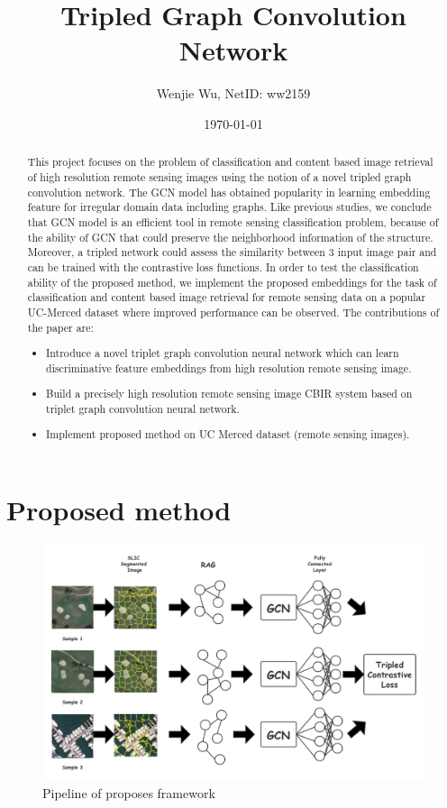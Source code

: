 \documentclass[11pt]{article}
\begin{document}
\title{Tripled Graph Convolution Network}
\date{\today}
\author{Wenjie Wu, NetID: ww2159}
\maketitle
\begin{abstract}
This project focuses on the problem of classification and content based image retrieval of high resolution remote sensing images using the notion of a novel tripled graph convolution network. The GCN model has obtained popularity in learning embedding feature for irregular domain data including graphs. Like previous studies, we conclude that GCN model is an efficient tool in remote sensing classification problem, because of the ability of GCN that could preserve the neighborhood information of the structure. Moreover, a tripled network could assess the similarity between 3 input image pair and can be trained with the contrastive loss functions. In order to test the classification ability of the proposed method, we implement the proposed embeddings for the task of classification and content based image retrieval for remote sensing data on a popular UC-Merced dataset where improved performance can be observed. The contributions of the paper are:
\begin{itemize}
	\item Introduce a novel triplet graph convolution neural network which can learn discriminative feature embeddings from high resolution remote sensing image.
	\item Build a precisely high resolution remote sensing image CBIR system based on triplet graph convolution neural network.
	\item Implement proposed method on UC Merced dataset (remote sensing images).
\end{itemize}
\end{abstract}
\section{Proposed method}
\begin{figure}
	\centering
	\includegraphics[width=5in]{pipeline}
	\caption{Pipeline of proposes framework}
\end{figure}
\end{document}
